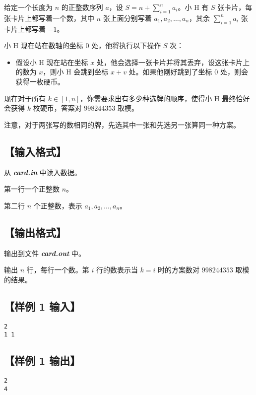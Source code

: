 \documentclass[UTF8]{ctexart}
\newcommand\file[1]{\textbf{\textit{#1}}}
\begin{document}
	给定一个长度为 $n$ 的正整数序列 $a$，设 $S = n+\sum\limits_{i=1}^n a_i$。小 H 有 $S$ 张卡片，每张卡片上都写着一个数，其中 $n$ 张上面分别写着 $a_1,a_2,\ldots,a_n$，其余 $\sum\limits_{i=1}^n a_i$ 张卡片上都写着 $-1$。
	
	小 H 现在站在数轴的坐标 $0$ 处，他将执行以下操作 $S$ 次：

	\begin{itemize}
		\item 假设小 H 现在站在坐标 $x$ 处，他会选择一张卡片并将其丢弃，设这张卡片上的数为 $x$，则小 H 会跳到坐标 $x+v$ 处。如果他刚好跳到了坐标 $0$ 处，则会获得一枚硬币。
	\end{itemize}

	现在对于所有 $k\in [1,n]$，你需要求出有多少种选牌的顺序，使得小 H 最终恰好会获得 $k$ 枚硬币，答案对 $998244353$ 取模。

	注意，对于两张写的数相同的牌，先选其中一张和先选另一张算同一种方案。
	
	\subsection[输入格式]{【输入格式】}
	
	从 \file{card.in} 中读入数据。

	第一行一个正整数 $n$。

	第二行 $n$ 个正整数，表示 $a_1,a_2,\ldots,a_n$。
	
	\subsection[输出格式]{【输出格式】}
	
	输出到文件 \file{card.out} 中。

	输出 $n$ 行，每行一个数。第 $i$ 行的数表示当 $k=i$ 时的方案数对 $998244353$ 取模的结果。
	
	\subsection[样例 1 输入]{【样例 1 输入】}
	
	\begin{lstlisting}
2
1 1
	\end{lstlisting}
	
	\subsection[样例 1 输出]{【样例 1 输出】}
	
	\begin{lstlisting}
2
4
	\end{lstlisting}
	
\end{document}
